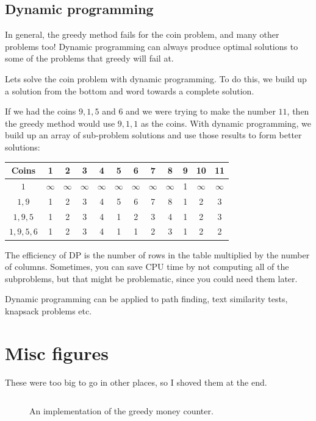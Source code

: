 \subsection{Dynamic programming}

In general, the greedy method fails for the coin problem, and many other
problems too! Dynamic programming can always produce optimal solutions to some
of the problems that greedy will fail at.

Lets solve the coin problem with dynamic programming. To do this, we build up a
solution from the bottom and word towards a complete solution.

If we had the coins $9,1,5$ and $6$ and we were trying to make the number $11$,
then the greedy method would use $9,1,1$ as the coins. With dynamic programming,
we build up an array of sub-problem solutions and use those results to form
better solutions:

\begin{center}
  \begin{tabular}{c | c c c c c c c c c c c}
    Coins & 1 & 2 & 3 & 4 & 5 & 6 & 7 & 8 & 9 & 10 & 11\\ \hline
    $1$   & $\infty$ & $\infty$ & $\infty$ & $\infty$ & $\infty$ & $\infty$ & $\infty$ & $\infty$ & 1 & $\infty$ & $\infty$ \\
    $1,9$ & 1 & 2 & 3 & 4 & 5 & 6 & 7 & 8 & 1 & 2 & 3\\
    $1,9,5$ & 1 & 2 & 3 & 4 & 1 & 2 & 3 & 4 & 1 & 2 & 3\\
    $1,9,5,6$ & 1 & 2 & 3 & 4 & 1 & 1 & 2 & 3 & 1 & 2 & 2\\
  \end{tabular}
\end{center}

The efficiency of DP is the number of rows in the table multiplied by the number
of columns. Sometimes, you can save CPU time by not computing all of the
subproblems, but that might be problematic, since you could need them later.

Dynamic programming can be applied to path finding, text similarity tests,
knapsack problems etc.

\section{Misc figures}

These were too big to go in other places, so I shoved them at the end.

\begin{figure}[H]
  \label{greedy}
  \inputminted{java}{code/Greedy/Greedy.java}
  \caption{An implementation of the greedy money counter.}
\end{figure}

